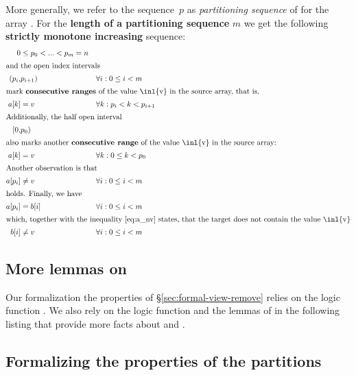 More generally, we refer to the sequence~$p$ as \emph{partitioning sequence} of \removecopy for the array .
For the \textbf{length of a partitioning sequence} $m$ we get the following \textbf{strictly monotone increasing} sequence:
\begin{align}
  \label{eq:remove-monotone}
  0 &\leq  p_0 < ... < p_{m} = n \\
  \intertext{and the open index intervals}
  \nonumber
  (p_i,&p_{i+1}) && \forall i: 0 \leq i < m\\
  \intertext{mark \textbf{consecutive ranges} of the value \inl{v}
  in the source array, that is,}
  \label{eq:between}
  a[k] &= v &&\forall k: p_i < k < p_{i+1}\\
  \intertext{Additionally, the half open interval}
  \nonumber
  [0,&p_{0})\\ 
  \intertext{also marks another \textbf{consecutive range} of the value \inl{v} in the
  source array:}
  \label{eq:beginning}
  a[k] &= v &&\forall k: 0 \leq k < p_{0}\\
  \intertext{Another observation is that} 
  \label{eq:a_nv}
  a[p_i] &\neq v &&\forall i: 0 \leq i < m\\
  \intertext{holds. Finally, we have}
  \label{eq:b_eqa}
  a[p_i] &= b[i] &&\forall i: 0 \leq i < m\\
  \intertext{which, together with the inequality~\eqref{eq:a_nv} 
  states, that the target does not contain the value~\inl{v}}
  \nonumber
  b[i] &\neq v &&\forall i:0 \leq i < m 
\end{align} 

\subsection{More lemmas on \CountNotEqual}

Our formalization the properties of \S\ref{sec:formal-view-remove}
relies on the logic function .
We also rely on the logic function  and
the lemmas of  in the following listing that provide more
facts about \CountNotEqual and \FindNotEqual.



\clearpage

\subsection{Formalizing the properties of the partitions}

